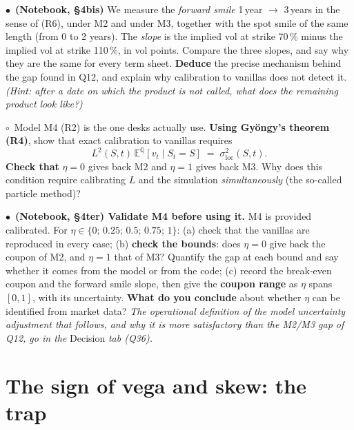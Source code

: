 \documentclass[11pt,a4paper]{article}
\newcommand{\team}{\textcolor{teamblue}{$\bullet$}}
\newcommand{\opt}{$\circ$}
\newcommand{\E}{\mathbb{E}^{\mathbb{Q}}}
\begin{document}
\begin{questions}[resume]
  \item \team\ \textbf{(Notebook, \S4bis)} We measure the \emph{forward smile} 1\,year $\to$ 3\,years in the sense of (R6),
  under M2 and under M3, together with the spot smile of the same length (from 0 to 2 years).
  The \emph{slope} is the implied vol at strike 70\,\% minus the implied vol at strike 110\,\%, in vol points.
  Compare the three slopes, and say why they are the same for every term sheet. \textbf{Deduce} the
  precise mechanism behind the gap found in Q12, and explain why calibration to vanillas does
  not detect it. \emph{(Hint: after a date on which the product is not called, what does the remaining
  product look like?)}

  \item \opt\ Model M4 (R2) is the one desks actually use. \textbf{Using Gyöngy's theorem (R4)}, show that
  exact calibration to vanillas requires
  \[
    L^2(S,t)\,\E[v_t \mid S_t = S] \;=\; \sigma^2_{\mathrm{loc}}(S,t).
  \]
  \textbf{Check that} $\eta = 0$ gives back M2 and $\eta = 1$ gives back M3. Why does this condition require
  calibrating $L$ and the simulation \emph{simultaneously} (the so-called particle method)?

  \item \team\ \textbf{(Notebook, \S4ter) Validate M4 before using it.} M4 is provided calibrated. For $\eta \in
  \{0;\, 0.25;\, 0.5;\, 0.75;\, 1\}$: (a) check that the vanillas are reproduced in every case; (b) \textbf{check the
  bounds}: does $\eta = 0$ give back the coupon of M2, and $\eta = 1$ that of M3? Quantify the gap at
  each bound and say whether it comes from the model or from the code; (c) record the break-even
  coupon and the forward smile slope, then give the \textbf{coupon range} as $\eta$ spans $[0,1]$, with
  its uncertainty. \textbf{What do you conclude} about whether $\eta$ can be identified from market data?
  \emph{The operational definition of the model uncertainty adjustment that follows, and why it is more
  satisfactory than the M2/M3 gap of Q12, go in the} Decision \emph{tab (Q36).}
\end{questions}

\section{The sign of vega and skew: the trap}
\end{document}
